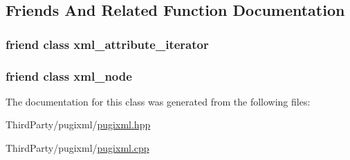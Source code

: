 \subsection{Friends And Related Function Documentation}
\hypertarget{classpugi_1_1xml__attribute_aeff34dec57ee910e3344631528969539}{
\subsubsection[{xml\-\_\-attribute\-\_\-iterator}]{\setlength{\rightskip}{0pt plus 5cm}friend class {\bf xml\-\_\-attribute\-\_\-iterator}\hspace{0.3cm}{\ttfamily [friend]}}}\label{classpugi_1_1xml__attribute_aeff34dec57ee910e3344631528969539}
\hypertarget{classpugi_1_1xml__attribute_a156d917a92815c7b593bd5ef19f6d5fb}{
\subsubsection[{xml\-\_\-node}]{\setlength{\rightskip}{0pt plus 5cm}friend class {\bf xml\-\_\-node}\hspace{0.3cm}{\ttfamily [friend]}}}\label{classpugi_1_1xml__attribute_a156d917a92815c7b593bd5ef19f6d5fb}


The documentation for this class was generated from the following files\-:\begin{DoxyCompactItemize}
\item 
Third\-Party/pugixml/\hyperlink{pugixml_8hpp}{pugixml.\-hpp}\item 
Third\-Party/pugixml/\hyperlink{pugixml_8cpp}{pugixml.\-cpp}\end{DoxyCompactItemize}
